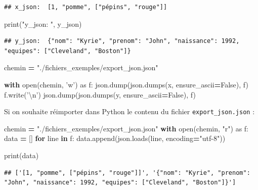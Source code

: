 \documentclass[12pt,]{book}
\newenvironment{Shaded}{\begin{snugshade}}{\end{snugshade}}
\newcommand{\KeywordTok}[1]{\textcolor[rgb]{0.13,0.29,0.53}{\textbf{#1}}}
\newcommand{\CharTok}[1]{\textcolor[rgb]{0.31,0.60,0.02}{#1}}
\newcommand{\StringTok}[1]{\textcolor[rgb]{0.31,0.60,0.02}{#1}}
\newcommand{\ImportTok}[1]{#1}
\newcommand{\VariableTok}[1]{\textcolor[rgb]{0.00,0.00,0.00}{#1}}
\newcommand{\ControlFlowTok}[1]{\textcolor[rgb]{0.13,0.29,0.53}{\textbf{#1}}}
\newcommand{\OperatorTok}[1]{\textcolor[rgb]{0.81,0.36,0.00}{\textbf{#1}}}
\newcommand{\BuiltInTok}[1]{#1}
\newcommand{\NormalTok}[1]{#1}
\numberwithin{equation}{section}
\numberwithin{countremarque}{section}
\begin{document}
\begin{lstlisting}
## x_json:  [1, "pomme", ["pépins", "rouge"]]
\end{lstlisting}

\begin{Shaded}
\begin{Highlighting}[]
\BuiltInTok{print}\NormalTok{(}\StringTok{"y_json: "}\NormalTok{, y_json)}
\end{Highlighting}
\end{Shaded}

\begin{lstlisting}
## y_json:  {"nom": "Kyrie", "prenom": "John", "naissance": 1992, "equipes": ["Cleveland", "Boston"]}
\end{lstlisting}

\begin{Shaded}
\begin{Highlighting}[]
\NormalTok{chemin }\OperatorTok{=} \StringTok{"./fichiers_exemples/export_json.json"}

\ControlFlowTok{with} \BuiltInTok{open}\NormalTok{(chemin, }\StringTok{'w'}\NormalTok{) }\ImportTok{as}\NormalTok{ f:}
\NormalTok{    json.dump(json.dumps(x, ensure_ascii}\OperatorTok{=}\VariableTok{False}\NormalTok{), f)}
\NormalTok{    f.write(}\StringTok{'}\CharTok{\textbackslash{}n}\StringTok{'}\NormalTok{)}
\NormalTok{    json.dump(json.dumps(y, ensure_ascii}\OperatorTok{=}\VariableTok{False}\NormalTok{), f)}
\end{Highlighting}
\end{Shaded}

Si on souhaite réimporter dans Python le contenu du fichier
\texttt{export\_json.json} :

\begin{Shaded}
\begin{Highlighting}[]
\NormalTok{chemin }\OperatorTok{=} \StringTok{"./fichiers_exemples/export_json.json"}
\ControlFlowTok{with} \BuiltInTok{open}\NormalTok{(chemin, }\StringTok{"r"}\NormalTok{) }\ImportTok{as}\NormalTok{ f:}
\NormalTok{    data }\OperatorTok{=}\NormalTok{ []}
    \ControlFlowTok{for}\NormalTok{ line }\KeywordTok{in}\NormalTok{ f:}
\NormalTok{        data.append(json.loads(line, encoding}\OperatorTok{=}\StringTok{"utf-8"}\NormalTok{))}

\BuiltInTok{print}\NormalTok{(data)}
\end{Highlighting}
\end{Shaded}

\begin{lstlisting}
## ['[1, "pomme", ["pépins", "rouge"]]', '{"nom": "Kyrie", "prenom": "John", "naissance": 1992, "equipes": ["Cleveland", "Boston"]}']
\end{lstlisting}
\end{document}
